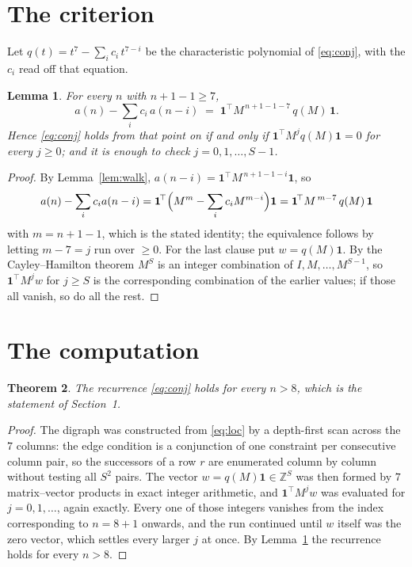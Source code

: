 \documentclass[11pt,a4paper]{article}
\theoremstyle{plain}
\newtheorem{theorem}{Theorem}
\newtheorem{lemma}[theorem]{Lemma}
\theoremstyle{definition}
\begin{document}
\section{The criterion}

Let $q(t)=t^{7}-\sum_i c_i\,t^{7-i}$ be the characteristic polynomial of
\eqref{eq:conj}, with the $c_i$ read off that equation.

\begin{lemma}\label{lem:crit}
For every $n$ with $n+1-1\ge7$,
\[
a(n)-\sum_i c_i\,a(n-i)\;=\;\mathbf{1}^{\!\top}M^{\,n+1-1-7}\,q(M)\,\mathbf{1} .
\]
Hence \eqref{eq:conj} holds from that point on if and only if
$\mathbf{1}^{\!\top}M^{j}q(M)\mathbf{1}=0$ for every $j\ge0$; and it is enough to check
$j=0,1,\dots,S-1$.
\end{lemma}

\begin{proof}
By Lemma~\ref{lem:walk}, $a(n-i)=\mathbf{1}^{\!\top}M^{\,n+1-1-i}\mathbf{1}$, so
\[
a(n)-\sum_i c_i a(n-i)
=\mathbf{1}^{\!\top}\Bigl(M^{m}-\sum_i c_i M^{m-i}\Bigr)\mathbf{1}
=\mathbf{1}^{\!\top}M^{\,m-7}\,q(M)\,\mathbf{1}
\]
with $m=n+1-1$, which is the stated identity; the equivalence follows by letting
$m-7=j$ run over $\ge0$. For the last clause put $w=q(M)\mathbf{1}$. By the
Cayley--Hamilton theorem $M^{S}$ is an integer combination of $I,M,\dots,M^{S-1}$, so
$\mathbf{1}^{\!\top}M^{j}w$ for $j\ge S$ is the corresponding combination of the earlier
values; if those all vanish, so do all the rest.
\end{proof}

\section{The computation}

\begin{theorem}
The recurrence \eqref{eq:conj} holds for every $n>8$, which is the statement of
Section~1.
\end{theorem}

\begin{proof}
The digraph was constructed from \eqref{eq:loc} by a depth-first scan across the $7$
columns: the edge condition is a conjunction of one constraint per consecutive column
pair, so the successors of a row $r$ are enumerated column by column without testing all
$S^2$ pairs. The vector $w=q(M)\mathbf{1}\in\mathbb{Z}^{S}$ was then formed by $7$
matrix--vector products in exact integer arithmetic, and $\mathbf{1}^{\!\top}M^{j}w$ was
evaluated for $j=0,1,\dots$, again exactly. Every one of those integers vanishes from the
index corresponding to $n=8+1$ onwards, and the run continued until $w$ itself was the
zero vector, which settles every larger $j$ at once. By Lemma~\ref{lem:crit} the recurrence
holds for every $n>8$.
\end{proof}
\end{document}
